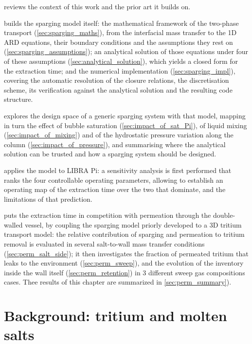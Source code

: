 \documentclass[a4paper,11pt,oneside]{report}
\newcounter{assumption}[chapter]
\begin{document}
 reviews the context of this work and the prior art it builds on.

 builds the sparging model itself: the mathematical framework of the two-phase transport (\cref{sec:sparging_maths}), from the interfacial mass transfer to the 1D ARD equations, their boundary conditions and the assumptions they rest on (\cref{sec:sparging_assumptions}); an analytical solution of those equations under four of these assumptions (\cref{sec:analytical_solution}), which yields a closed form for the extraction time; and the numerical implementation (\cref{sec:sparging_impl}), covering the automatic resolution of the closure relations, the discretisation scheme, its verification against the analytical solution and the resulting code structure.

 explores the design space of a generic sparging system with that model, mapping in turn the effect of bubble saturation (\cref{sec:impact_of_sat_Pi}), of liquid mixing (\cref{sec:impact_of_mixing}) and of the hydrostatic pressure variation along the column (\cref{sec:impact_of_pressure}), and summarising where the analytical solution can be trusted and how a sparging system should be designed.

 applies the model to LIBRA Pi: a sensitivity analysis is first performed that ranks the four controllable operating parameters, allowing to establish an operating map of the extraction time over the two that dominate, and the limitations of that prediction.

 puts the extraction time in competition with permeation through the double-walled vessel, by coupling the sparging model priorly developed to a 3D tritium transport model: the relative contribution of sparging and permeation to tritium removal is evaluated in several salt-to-wall mass transfer conditions (\cref{sec:perm_salt_side}); it then investigates the fraction of permeated tritium that leaks to the environment (\cref{sec:perm_sweep}), and the evolution of the inventory inside the wall itself (\cref{sec:perm_retention}) in 3 different sweep gas compositions cases. Thee results of this chapter are summarized in \cref{sec:perm_summary}).

\chapter{Background: tritium and molten salts}
\label{sec:background}
\end{document}
